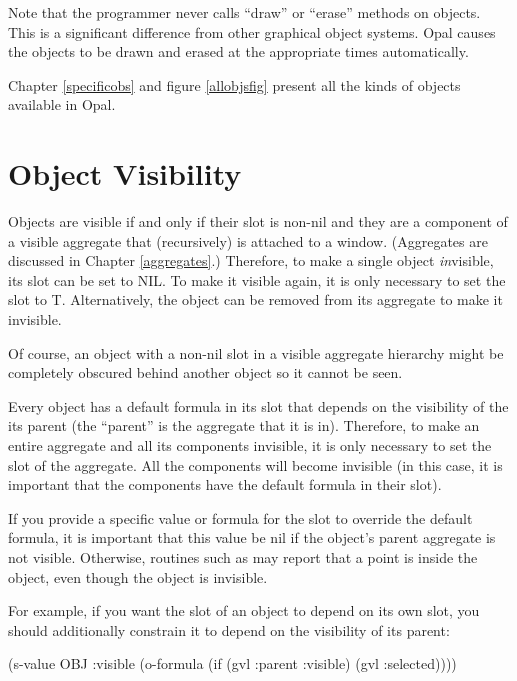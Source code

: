 Note that the programmer never calls ``draw'' or ``erase'' methods on
objects.  This is a significant difference from other graphical object
systems.  Opal causes the objects to be drawn and erased at the appropriate
times automatically.

Chapter \ref{specificobs} and figure \ref{allobjsfig} present all the kinds
of objects available in Opal.


\section{Object Visibility}

Objects are visible if and only if their  slot is non-{\sc nil} and
they are a component of a visible aggregate that (recursively) is attached
to a window.  (Aggregates are discussed in Chapter \ref{aggregates}.)
Therefore, to make a single object {\it in}visible, its
 slot can be set to NIL.  To make it visible
again, it is only necessary to set the  slot to T.
Alternatively, the object can be removed from its aggregate to make it
invisible.

Of course, an object with a non-{\sc nil}  slot in a visible
aggregate hierarchy might be completely obscured behind another object
so it cannot be seen.

Every object has a default formula in its  slot that depends
on the visibility of the its parent (the ``parent'' is the aggregate that
it is in).  Therefore, to make an entire aggregate and all its components
invisible, it is only
necessary to set the  slot of the aggregate.  All the
components will become invisible (in this case, it is important that the
components have the default formula in their  slot).

If you provide a specific value or formula for the  slot to
override the default formula, it is important that this value be {\sc nil}
if the object's parent aggregate is not visible.  Otherwise, routines such as
 may report that a point is inside the object, even though
the object is invisible.

For example, if you want the  slot of an object to depend
on its own  slot, you should additionally constrain it
to depend on the visibility of its parent:

\begin{programexample}
(s-value OBJ :visible (o-formula (if (gvl :parent :visible)
                                     (gvl :selected))))
\end{programexample}


